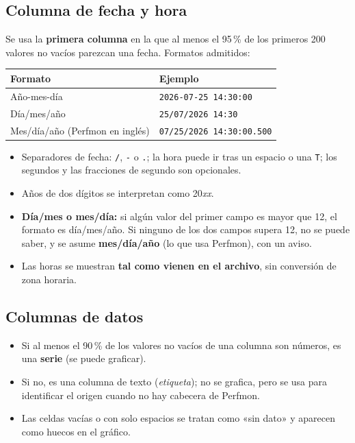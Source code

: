 \documentclass[11pt,a4paper,oneside]{report}
\begin{document}
\subsection{Columna de fecha y hora}
Se usa la \textbf{primera columna} en la que al menos el 95\,\% de los primeros
200 valores no vacíos parezcan una fecha. Formatos admitidos:

\begin{center}
\begin{tabular}{ll}
  \toprule
  Formato & Ejemplo \\
  \midrule
  Año-mes-día & \texttt{2026-07-25 14:30:00} \\
  Día/mes/año & \texttt{25/07/2026 14:30} \\
  Mes/día/año (Perfmon en inglés) & \texttt{07/25/2026 14:30:00.500} \\
  \bottomrule
\end{tabular}
\end{center}

\begin{itemize}
  \item Separadores de fecha: \texttt{/}, \texttt{-} o \texttt{.}; la hora
        puede ir tras un espacio o una \texttt{T}; los segundos y las
        fracciones de segundo son opcionales.
  \item Años de dos dígitos se interpretan como 20\emph{xx}.
  \item \textbf{Día/mes o mes/día:} si algún valor del primer campo es mayor que
        12, el formato es día/mes/año. Si ninguno de los dos campos supera 12,
        no se puede saber, y se asume \textbf{mes/día/año} (lo que usa
        Perfmon), con un aviso.
  \item Las horas se muestran \textbf{tal como vienen en el archivo}, sin
        conversión de zona horaria.
\end{itemize}

\subsection{Columnas de datos}
\begin{itemize}
  \item Si al menos el 90\,\% de los valores no vacíos de una columna son
        números, es una \textbf{serie} (se puede graficar).
  \item Si no, es una columna de texto (\emph{etiqueta}); no se grafica, pero se
        usa para identificar el origen cuando no hay cabecera de Perfmon.
  \item Las celdas vacías o con solo espacios se tratan como «sin dato» y
        aparecen como huecos en el gráfico.
\end{itemize}
\end{document}

